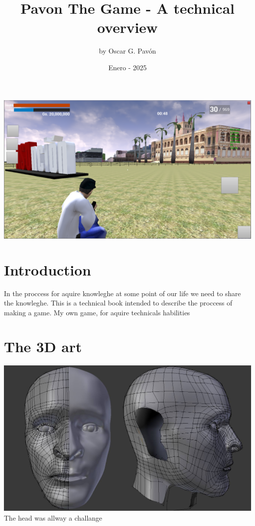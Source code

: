 \documentclass{article}
\title{Pavon The Game - A technical overview}
\date{Enero - 2025}
\author{by Oscar G. Pav\'on}
\begin{document}
  \maketitle
  \includegraphics[width=\textwidth]{1.png}


  \newpage
  \section{Introduction}
  In the proccess for aquire knowleghe at some point of our life we need to share the knowleghe.
  This is a technical book intended to describe the proccess of making a game. My own game, for aquire technicals habilities

  \newpage
  \section{The 3D art}
  
  \includegraphics[width=\textwidth]{4.jpg}
  The head was allway a challange
\end{document}
